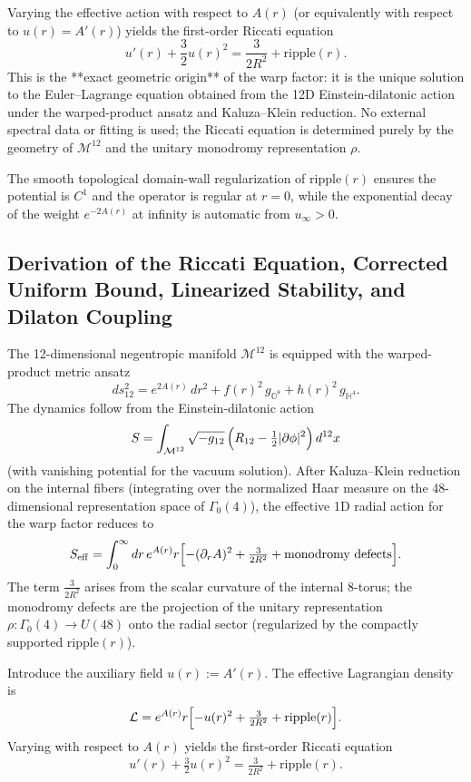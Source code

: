\documentclass[11pt,a4paper]{article}
\begin{document}
Varying the effective action with respect to \(A(r)\) (or equivalently with respect to \(u(r)=A'(r)\)) yields the first-order Riccati equation
\[
u'(r) + \frac{3}{2}u(r)^2 = \frac{3}{2R^2} + \mathrm{ripple}(r).
\]
This is the **exact geometric origin** of the warp factor: it is the unique solution to the Euler--Lagrange equation obtained from the 12D Einstein-dilatonic action under the warped-product ansatz and Kaluza--Klein reduction. No external spectral data or fitting is used; the Riccati equation is determined purely by the geometry of \(\mathcal{M}^{12}\) and the unitary monodromy representation \(\rho\).

The smooth topological domain-wall regularization of \(\mathrm{ripple}(r)\) ensures the potential is \(C^1\) and the operator is regular at \(r=0\), while the exponential decay of the weight \(e^{-2A(r)}\) at infinity is automatic from \(u_\infty > 0\).

\subsection{Derivation of the Riccati Equation, Corrected Uniform Bound, Linearized Stability, and Dilaton Coupling}

The 12-dimensional negentropic manifold \(\mathcal{M}^{12}\) is equipped with the warped-product metric ansatz
\[
ds_{12}^2 = e^{2A(r)}\,dr^2 + f(r)^2\,g_{\mathbb{O}^8} + h(r)^2\,g_{\mathbb{H}^4}.
\]
The dynamics follow from the Einstein-dilatonic action
\[
S = \int_{\mathcal{M}^{12}} \sqrt{-g_{12}}\,\Bigl(R_{12} - \tfrac12 |\partial\phi|^2\Bigr)\,d^{12}x
\]
(with vanishing potential for the vacuum solution). After Kaluza--Klein reduction on the internal fibers (integrating over the normalized Haar measure on the 48-dimensional representation space of \(\Gamma_0(4)\)), the effective 1D radial action for the warp factor reduces to
\[
S_{\rm eff} = \int_0^\infty dr\, e^{A(r)} r \Bigl[ -(\partial_r A)^2 + \tfrac{3}{2R^2} + \text{monodromy defects} \Bigr].
\]
The term \(\tfrac{3}{2R^2}\) arises from the scalar curvature of the internal 8-torus; the monodromy defects are the projection of the unitary representation \(\rho:\Gamma_0(4)\to U(48)\) onto the radial sector (regularized by the compactly supported \(\mathrm{ripple}(r)\)).

Introduce the auxiliary field \(u(r) := A'(r)\). The effective Lagrangian density is
\[
\mathcal{L} = e^{A(r)} r \Bigl[ -u(r)^2 + \tfrac{3}{2R^2} + \mathrm{ripple}(r) \Bigr].
\]
Varying with respect to \(A(r)\) yields the first-order Riccati equation
\[
u'(r) + \tfrac{3}{2} u(r)^2 = \tfrac{3}{2R^2} + \mathrm{ripple}(r).
\]
\end{document}

